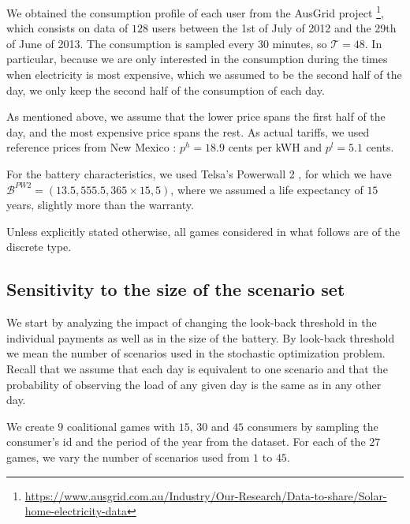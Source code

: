 \documentclass[sigconf, table]{acmart}
\newcommand{\Bat}{\mathcal{B}}
\newcommand{\pricelow}{p^l}
\newcommand{\pricehigh}{p^h}
\begin{document}
We obtained the consumption profile of each user from the AusGrid project \cite{ausgrid_analysis}\footnote{\url{https://www.ausgrid.com.au/Industry/Our-Research/Data-to-share/Solar-home-electricity-data}}, which consists on data of $128$ users between the 1st of July of 2012 and the 29th of June of 2013. The consumption is sampled every $30$ minutes, so $\mathcal{T} = 48$. In particular, because we are only interested in the consumption during the times when electricity is most expensive, which we assumed to be the second half of the day, we only keep the second half of the consumption of each day. 

As mentioned above, we assume that the lower price spans the first half of the day, and the most expensive price spans the rest. As actual tariffs, we used reference prices from New Mexico  \cite{mexico_tariff}: $\pricehigh = 18.9$ cents per kWH and $\pricelow = 5.1$ cents.

For the battery characteristics, we used Telsa's Powerwall 2 \cite{powerwall2}, for which we have $\Bat^{PW2} = (13.5, 555.5, 365 \times 15, 5)$, where we assumed a life expectancy of $15$ years, slightly more than the warranty.

Unless explicitly stated otherwise, all games considered in what follows are of the discrete type.

\subsection{Sensitivity to the size of the scenario set}\label{sub:sens_scenario}

We start by analyzing the impact of changing the look-back threshold in the individual payments as well as in the size of the battery. By look-back threshold we mean the number of scenarios used in the stochastic optimization problem. Recall that we assume that each day is equivalent to one scenario and that the probability of observing the load of any given day is the same as in any other day.

We create $9$ coalitional games with $15$, $30$ and $45$ consumers  by sampling the consumer's id and the period of the year from the dataset. For each of the $27$ games, we vary the number of scenarios used from $1$ to $45$. 
\end{document}
